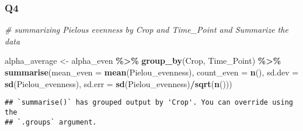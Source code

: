 \documentclass[
]{article}
\newenvironment{Shaded}{\begin{snugshade}}{\end{snugshade}}
\newcommand{\AttributeTok}[1]{\textcolor[rgb]{0.13,0.29,0.53}{#1}}
\newcommand{\CommentTok}[1]{\textcolor[rgb]{0.56,0.35,0.01}{\textit{#1}}}
\newcommand{\DocumentationTok}[1]{\textcolor[rgb]{0.56,0.35,0.01}{\textbf{\textit{#1}}}}
\newcommand{\FunctionTok}[1]{\textcolor[rgb]{0.13,0.29,0.53}{\textbf{#1}}}
\newcommand{\NormalTok}[1]{#1}
\newcommand{\OtherTok}[1]{\textcolor[rgb]{0.56,0.35,0.01}{#1}}
\newcommand{\SpecialCharTok}[1]{\textcolor[rgb]{0.81,0.36,0.00}{\textbf{#1}}}
\begin{document}
\begin{Shaded}
\end{Shaded}

\subsubsection{Q4}\label{q4}

\begin{Shaded}
\begin{Highlighting}[]
\CommentTok{\# summarizing Pielou\textquotesingle{}s evenness by Crop and Time\_Point and Summarize the data}

\NormalTok{alpha\_average }\OtherTok{\textless{}{-}}\NormalTok{ alpha\_even }\SpecialCharTok{\%\textgreater{}\%}
                  \FunctionTok{group\_by}\NormalTok{(Crop, Time\_Point) }\SpecialCharTok{\%\textgreater{}\%}
                  \FunctionTok{summarise}\NormalTok{(}\AttributeTok{mean\_even =} \FunctionTok{mean}\NormalTok{(Pielou\_evenness),}
                  \AttributeTok{count\_even =} \FunctionTok{n}\NormalTok{(),}
                  \AttributeTok{sd.dev =} \FunctionTok{sd}\NormalTok{(Pielou\_evenness),}
                  \AttributeTok{sd.err =} \FunctionTok{sd}\NormalTok{(Pielou\_evenness)}\SpecialCharTok{/}\FunctionTok{sqrt}\NormalTok{(}\FunctionTok{n}\NormalTok{()))}
\end{Highlighting}
\end{Shaded}

\begin{verbatim}
## `summarise()` has grouped output by 'Crop'. You can override using the
## `.groups` argument.
\end{verbatim}
\end{document}
